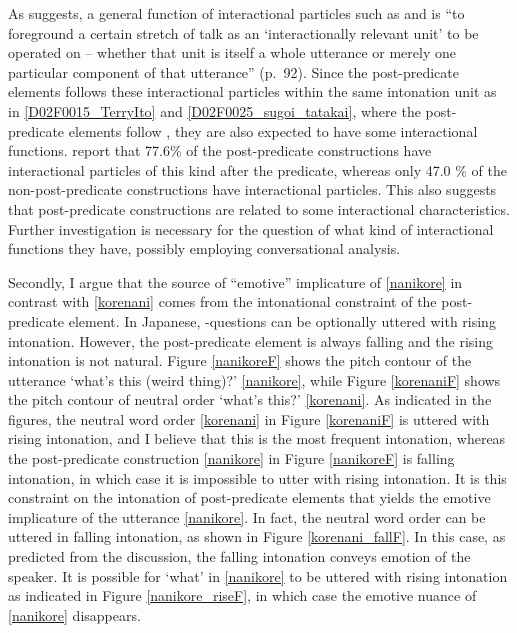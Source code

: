As  suggests,
a general function of interactional particles such as  and  is ``to foreground a certain stretch of talk as an `interactionally relevant unit' to be operated on
-- whether that unit is itself a whole utterance or merely one particular component of that utterance'' (p.~92).
Since the post-predicate elements follows these interactional particles within the same intonation unit as in \ref{D02F0015_TerryIto} and \ref{D02F0025_sugoi_tatakai},
where the post-predicate elements follow ,
they are also expected to have some interactional functions.
 report that
77.6\% of the post-predicate constructions have interactional particles of this kind after the predicate,
whereas only 47.0 \% of the non-post-predicate constructions have interactional particles.
This also suggests that post-predicate constructions are related to
some interactional characteristics.
Further investigation is necessary for the question of what kind of interactional functions they have,
possibly employing conversational analysis.

Secondly,
I argue that 
the source of ``emotive'' implicature of \ref{nanikore} in contrast with \ref{korenani} comes from the intonational constraint of the post-predicate element.
In Japanese, -questions can be optionally uttered with rising intonation.
However, the post-predicate element is always falling and the rising intonation is not natural.
Figure \ref{nanikoreF} shows the pitch contour of the utterance  `what's this (weird thing)?' \ref{nanikore},
while Figure \ref{korenaniF} shows the pitch contour of neutral order  `what's this?' \ref{korenani}.
As indicated in the figures, the neutral word order \ref{korenani} in Figure \ref{korenaniF} is uttered with rising intonation,
and I believe that this is the most frequent intonation,
whereas the post-predicate construction \ref{nanikore} in Figure \ref{nanikoreF} is falling intonation,
in which case it is impossible to utter  with rising intonation.
It is this constraint on the intonation of post-predicate elements that yields the emotive implicature of the utterance \ref{nanikore}.
In fact, the neutral word order  can be uttered in falling intonation, as shown in Figure \ref{korenani_fallF}.
In this case, as predicted from the discussion, the falling intonation conveys emotion of the speaker.
It is possible for  `what' in \ref{nanikore} to be uttered with rising intonation as indicated in Figure \ref{nanikore_riseF},
in which case the emotive nuance of \ref{nanikore} disappears.


